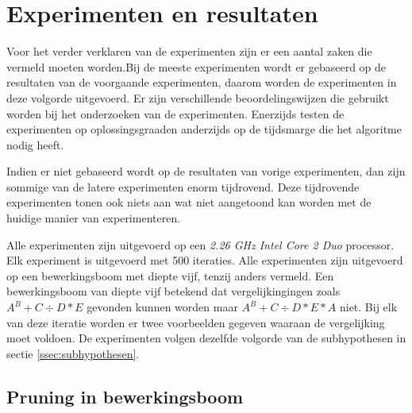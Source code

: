 \documentclass[Main.tex]{subfiles}
\begin{document}
\section{Experimenten en resultaten}
Voor het verder verklaren van de experimenten zijn er een aantal zaken die vermeld moeten worden.Bij de meeste experimenten wordt er gebaseerd op de resultaten van de voorgaande experimenten, daarom worden de experimenten in deze volgorde uitgevoerd. Er zijn verschillende beoordelingswijzen die gebruikt worden bij het onderzoeken van de experimenten. Enerzijds testen de experimenten op oplossingsgraad\footnotemark[\ref{note:oplossingsgraad}] en anderzijds op de tijdsmarge die het algoritme nodig heeft. 
\par
Indien er niet gebaseerd wordt op de resultaten van vorige experimenten, dan zijn sommige van de latere experimenten enorm tijdrovend. Deze tijdrovende experimenten tonen ook niets aan wat niet aangetoond kan worden met de huidige manier van experimenteren.
\par
Alle experimenten zijn uitgevoerd op een \textit{2.26 GHz Intel Core 2 Duo} processor. Elk experiment is uitgevoerd met 500 iteraties. Alle experimenten zijn uitgevoerd op een bewerkingsboom met diepte vijf, tenzij anders vermeld. Een bewerkingsboom van diepte vijf betekend dat vergelijkingingen zoals $A^{B}+C \div D \ast E$ gevonden kunnen worden maar $A^{B}+C \div D \ast E \ast A$ niet. Bij elk van deze iteratie worden er twee voorbeelden gegeven waaraan de vergelijking moet voldoen. De experimenten volgen dezelfde volgorde van de subhypothesen in sectie \ref{ssec:subhypothesen}.  


\subsection{Pruning in bewerkingsboom} \label{ssec:pruning}
\end{document}
